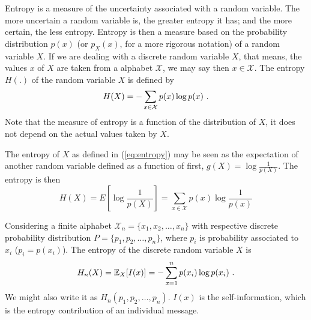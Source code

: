 Entropy is a measure of the uncertainty associated with a random variable. 
The more uncertain a random variable is, the greater entropy it has; and the more certain, the less entropy. 
Entropy is then a measure based on the probability distribution $p(x)$ (or $p_X(x)$, for a more rigorous notation) 
of a random variable $X$. If we are dealing with a discrete random variable $X$, that means, 
the values $x$ of $X$ are taken from a alphabet $\mathcal{X}$, we may say then $x \in \mathcal{X}$. 
The entropy $H(.)$ of the random variable $X$ is defined by
\begin{equation}
H(X) = - \sum_{x \in \mathcal{X}} p(x) \log p(x) \textmd{ .}
\label{eq:entropy}
\end{equation}
Note that the measure of entropy is a function of the distribution of $X$, 
it does not depend on the actual values taken by $X$.

The entropy of $X$ as defined in (\ref{eq:entropy}) may be seen as the expectation 
of another random variable defined as a function of first, $g(X) = \log \frac{1}{p(X)}$. 
The entropy is then
\begin{equation}
H(X) = E\left[ \log \frac{1}{p(X)} \right] = \sum_{x \in \mathcal{X}} p(x) \log \frac{1}{p(x)}
\end{equation}

Considering a finite alphabet $\mathcal{X}_n = \{x_1, x_2, \ldots, x_n \}$ with respective discrete 
probability distribution $P = \{p_1, p_2, \ldots, p_n\}$, where $p_i$ is probability associated to 
$x_i$ ($p_i = p(x_i)$). The entropy of the discrete random variable $X$ is
\begin{equation}
H_n(X) = \mathbb{E}_{X} [I(x)] = - \sum_{x = 1}^n p(x_i) \log p(x_i) \textmd{ .}
\end{equation}
We might also write it as $H_n(p_1, p_2, \ldots, p_n)$.
$I(x)$ is the self-information, which is the entropy contribution of an individual message.


